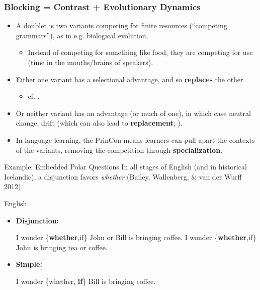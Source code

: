 \documentclass[hyperref={pdfpagelabels=false}]{beamer}
\begin{document}
\begin{frame}
\frametitle{Blocking = Contrast + Evolutionary Dynamics}
\begin{itemize}
	\item A doublet is two variants competing for finite resources (``competing grammars''), as in e.g. biological evolution.
		\begin{itemize} 
			\item Instead of competing for something like food, they are competing for use (time in the mouths/brains of speakers). 
			

			\end{itemize}
	\item Either one variant has a selectional advantage, and so \textbf{replaces} the other. 	
	\begin{itemize} \item \small{cf. \citet[][and subs.]{yang2000, yang2002}, \citet{heycockwallenberg2013}}

			\end{itemize}
	\item Or neither variant has an advantage (or much of one), in which case neutral change, drift (which can also lead to \textbf{replacement}; \citealt{kauhanen2016}).
	

	\item In language learning, the PrinCon means learners can pull apart the contexts of the variants, removing the competition through \textbf{specialization}.
\end{itemize}
\end{frame}


\begin{frame}{Example: Embedded Polar Questions}
		In all stages of English (and in historical Icelandic), a disjunction favors {\it whether} (Bailey, Wallenberg, \& van der Wurff 2012). \nocite{baileywallenbergwurff2012}
	\begin{block}{English}
		\begin{itemize}
		\item[ ]\textbf{Disjunction:}
		\begin{exe}
			\ex I wonder \{{\bf whether},if\} John or Bill is bringing coffee.
			\ex I wonder \{{\bf whether},if\} John is bringing tea or coffee.
		\end{exe}
		\item[ ]\textbf{Simple:}
		\begin{exe}
			\ex I wonder \{whether, {\bf if}\} Bill is bringing coffee.
		\end{exe}
		\end{itemize}
	
	\end{block}
\end{frame}
\end{document}
